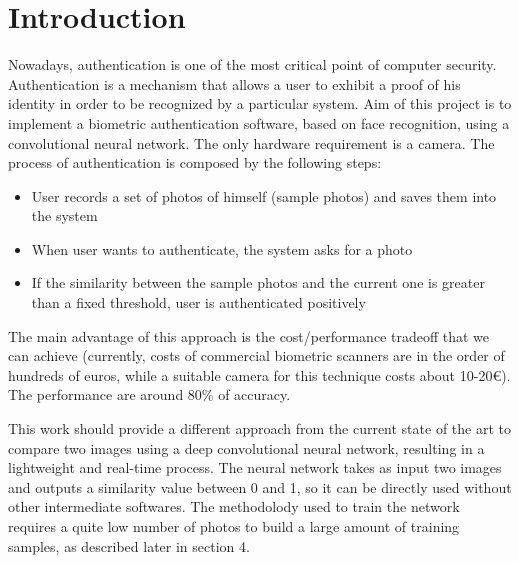\section{Introduction}

Nowadays, authentication is one of the most critical point of computer security. Authentication is a mechanism that allows a user to exhibit a proof of his identity in order to be recognized by a particular system. Aim of this project is to implement a biometric authentication software, based on face recognition, using a convolutional neural network. The only hardware requirement is a camera. The process of authentication is composed by the following steps:
\begin{itemize}
\item User records a set of photos of himself (sample photos) and saves them into the system
\item When user wants to authenticate, the system asks for a photo
\item If the similarity between the sample photos and the current one is greater than a fixed threshold, user is authenticated positively
\end{itemize}
The main advantage of this approach is the cost/performance tradeoff that we can achieve (currently, costs of commercial biometric scanners are in the order of hundreds of euros, while a suitable camera for this technique costs about 10-20\euro). The performance are around 80\% of accuracy.

This work should provide a different approach from the current state of the art to compare two images using a deep convolutional neural network, resulting in a lightweight and real-time process. The neural network takes as input two images and outputs a similarity value between 0 and 1, so it can be directly used without other intermediate softwares. The methodolody used to train the network requires a quite low number of photos to build a large amount of training samples, as described later in section 4.
